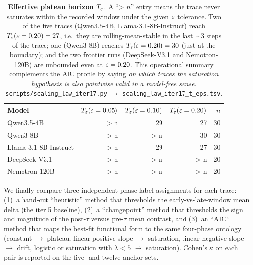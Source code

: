 \begin{table}[t]
  \centering
  \small
  \begin{tabular}{lrrrr}
    \toprule
    Model & $T_\varepsilon(\varepsilon = 0.05)$ & $T_\varepsilon(\varepsilon = 0.10)$ &
           $T_\varepsilon(\varepsilon = 0.20)$ & $n$ \\
    \midrule
    Qwen3.5-4B            & \textgreater{} n & 29 & 27 & 30 \\
    Qwen3-8B              & \textgreater{} n & \textgreater{} n & 30 & 30 \\
    Llama-3.1-8B-Instruct & \textgreater{} n & 29 & 27 & 30 \\
    DeepSeek-V3.1         & \textgreater{} n & \textgreater{} n & \textgreater{} n & 20 \\
    Nemotron-120B         & \textgreater{} n & \textgreater{} n & \textgreater{} n & 20 \\
    \bottomrule
  \end{tabular}
  \caption{\textbf{Effective plateau horizon $T_\varepsilon$}.  A
    ``\textgreater{} $n$'' entry means the trace never saturates
    within the recorded window under the given $\varepsilon$ tolerance.
    Two of the five traces (Qwen3.5-4B, Llama-3.1-8B-Instruct)
    reach $T_\varepsilon(\varepsilon = 0.20) = 27$, i.e.\ they are
    rolling-mean-stable in the last $\sim$3 steps of the trace;
    one (Qwen3-8B) reaches $T_\varepsilon(\varepsilon = 0.20) = 30$ (just at
    the boundary); and the two frontier runs (DeepSeek-V3.1 and
    Nemotron-120B) are unbounded even at $\varepsilon = 0.20$.  This
    operational summary complements the AIC profile by saying
    \emph{on which traces the saturation hypothesis is also
    pointwise valid in a model-free sense}.
    \texttt{scripts/scaling\_law\_iter17.py} $\to$
    \texttt{scaling\_law\_iter17\_t\_eps.tsv}.}
  \label{tab:scaling-iter17-teps}
\end{table}

We finally compare three independent phase-label assignments for
each trace: (1)~a hand-cut ``heuristic'' method that thresholds
the early-vs-late-window mean delta (the iter 5 baseline),
(2)~a ``changepoint'' method that thresholds the sign and
magnitude of the post-$\hat\tau$ versus pre-$\hat\tau$ mean
contrast, and (3)~an ``AIC'' method that maps the best-fit
functional form to the same four-phase ontology (constant $\to$
plateau, linear positive slope $\to$ saturation, linear
negative slope $\to$ drift, logistic or saturation with
$\lambda < 5$ $\to$ saturation).  Cohen's $\kappa$ on each
pair is reported on the five- and twelve-anchor sets.

